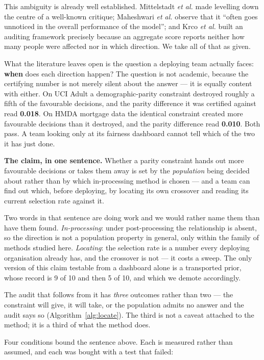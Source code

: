 \documentclass[9pt,conference]{IEEEtran}
\begin{document}
This ambiguity is already well established. Mittelstadt \emph{et al.} \cite{mittelstadt2023}
made levelling down the centre of a well-known critique; Maheshwari \emph{et al.}
\cite{maheshwari2023} observe that it ``often goes unnoticed in the overall performance of
the model''; and Krco \emph{et al.} \cite{ferry2023} built an auditing framework precisely
because an aggregate score reports neither how many people were affected nor in which
direction. We take all of that as given.

What the literature leaves open is the question a deploying team actually faces:
\textbf{when} does each direction happen? The question is not academic, because the
certifying number is not merely silent about the answer --- it is equally content with
either. On UCI Adult a demographic-parity constraint destroyed roughly a fifth of the
favourable decisions, and the parity difference it was certified against read
\textbf{0.018}. On HMDA mortgage data the identical constraint created more favourable
decisions than it destroyed, and the parity difference read \textbf{0.010}. Both pass. A
team looking only at its fairness dashboard cannot tell which of the two it has just done.

\textbf{The claim, in one sentence.} Whether a parity constraint hands out more favourable
decisions or takes them away is set by the \emph{population} being decided about rather than
by which in-processing method is chosen --- and a team can find out which, before deploying,
by locating its own crossover and reading its current selection rate against it.

Two words in that sentence are doing work and we would rather name them than have them found.
\emph{In-processing}: under post-processing the relationship is absent, so the direction is
not a population property in general, only within the family of methods studied here.
\emph{Locating}: the selection rate is a number every deploying organisation already has, and
the crossover is not --- it costs a sweep. The only version of this claim testable from a
dashboard alone is a transported prior, whose record is 9 of 10 and then 5 of 10, and which we
demote accordingly.

The audit that follows from it has \emph{three} outcomes rather than two --- the constraint
will give, it will take, or the population admits no answer and the audit says so
(Algorithm~\ref{alg:locate}). The third is not a caveat attached to the method; it is a third
of what the method does.

Four conditions bound the sentence above. Each is measured rather than assumed, and each was
bought with a test that failed:
\end{document}
